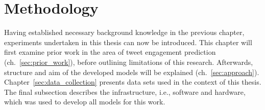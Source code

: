 \section{Methodology}
\label{ch:methodology}

Having established necessary background knowledge in the previous chapter,
experiments undertaken in this thesis can now be introduced.
This chapter will first examine prior work in the area of tweet engagement
prediction (ch.~\ref{sec:prior_work}), before outlining limitations of this
research.
Afterwards, structure and aim of the developed models will be explained (ch.~\ref{sec:approach}).
Chapter~\ref{sec:data_collection} presents data sets used in the context of this thesis.
The final subsection describes the infrastructure, i.e., software and hardware,
which was used to develop all models for this work.








